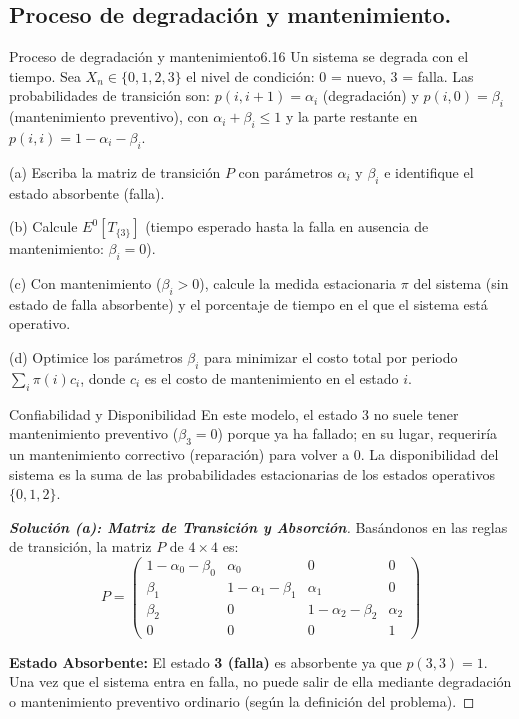 \documentclass[10pt,a4paper]{article}
\begin{document}
\newpage

\subsection{Proceso de degradación y mantenimiento.}



\begin{ejercicio}{Proceso de degradación y mantenimiento}{6.16}
    Un sistema se degrada con el tiempo. Sea $X_n \in \{0, 1, 2, 3\}$ el nivel de condición: 0 = nuevo, 3 = falla. Las probabilidades de transición son: $p(i, i + 1) = \alpha_i$ (degradación) y $p(i, 0) = \beta_i$ (mantenimiento preventivo), con $\alpha_i + \beta_i \le 1$ y la parte restante en $p(i, i) = 1 - \alpha_i - \beta_i$.
    
    (a) Escriba la matriz de transición $P$ con parámetros $\alpha_i$ y $\beta_i$ e identifique el estado absorbente (falla).
    
    (b) Calcule $E^0[T_{\{3\}}]$ (tiempo esperado hasta la falla en ausencia de mantenimiento: $\beta_i = 0$).
    
    (c) Con mantenimiento ($\beta_i > 0$), calcule la medida estacionaria $\pi$ del sistema (sin estado de falla absorbente) y el porcentaje de tiempo en el que el sistema está operativo.
    
    (d) Optimice los parámetros $\beta_i$ para minimizar el costo total por periodo $\sum_i \pi(i) c_i$, donde $c_i$ es el costo de mantenimiento en el estado $i$.
\end{ejercicio}

\vspace{2mm}

\begin{nota}{Confiabilidad y Disponibilidad}
    En este modelo, el estado 3 no suele tener mantenimiento preventivo ($\beta_3 = 0$) porque ya ha fallado; en su lugar, requeriría un mantenimiento correctivo (reparación) para volver a 0. La disponibilidad del sistema es la suma de las probabilidades estacionarias de los estados operativos $\{0, 1, 2\}$.
\end{nota}

\begin{proof}[\textbf{Solución (a): Matriz de Transición y Absorción}]
    Basándonos en las reglas de transición, la matriz $P$ de $4 \times 4$ es:
    \[ P = \begin{pmatrix} 
    1-\alpha_0-\beta_0 & \alpha_0 & 0 & 0 \\
    \beta_1 & 1-\alpha_1-\beta_1 & \alpha_1 & 0 \\
    \beta_2 & 0 & 1-\alpha_2-\beta_2 & \alpha_2 \\
    0 & 0 & 0 & 1 
    \end{pmatrix} \]
    
    \textbf{Estado Absorbente:} El estado \textbf{3 (falla)} es absorbente ya que $p(3,3) = 1$. Una vez que el sistema entra en falla, no puede salir de ella mediante degradación o mantenimiento preventivo ordinario (según la definición del problema).
\end{proof}
\end{document}
